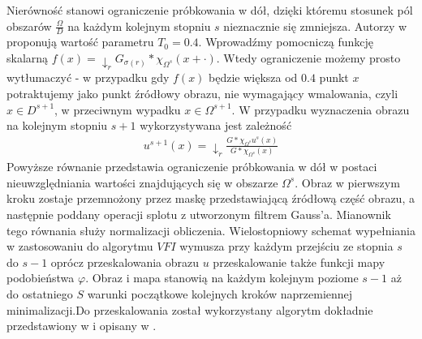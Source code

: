 \documentclass[12pt, twoside, openany]{report}
\theoremstyle{definition}
\begin{document}
Nierówność stanowi ograniczenie próbkowania w dół, dzięki któremu stosunek pól obszarów $\frac{\Omega}{D}$ na każdym kolejnym stopniu $s$ nieznacznie się zmniejsza. Autorzy w \cite{arias2011variational} proponują wartość parametru $T_0=0.4$. Wprowadźmy pomocniczą funkcję skalarną $f(x) = \downarrow_r G_{\sigma(r)}\ast\chi_{\Omega^s}(x + \cdot)$. Wtedy ograniczenie możemy prosto wytłumaczyć - w przypadku gdy $f(x)$ będzie większa od $0.4$ punkt $x$ potraktujemy jako punkt źródłowy obrazu, nie wymagający wmalowania, czyli $x \in D^{s+1}$, w przeciwnym wypadku $x \in \Omega^{s+1}.$ W przypadku wyznaczenia obrazu na kolejnym stopniu $s+1$ wykorzystywana jest zależność
\begin{align}
u^{s+1}(x)= \downarrow_r \frac{G \ast \chi_{\Omega^s} u^s(x)}{G \ast \chi_{\Omega^s}(x)}
\end{align}
Powyższe równanie przedstawia ograniczenie próbkowania w dół w postaci nieuwzględniania wartości znajdujących się w obszarze $\Omega^s$. Obraz w pierwszym kroku zostaje przemnożony przez maskę przedstawiającą źródłową część obrazu, a następnie poddany operacji splotu z utworzonym filtrem Gauss'a. Mianownik tego równania służy normalizacji obliczenia. Wielostopniowy schemat wypełniania w zastosowaniu do algorytmu $VFI$ wymusza przy każdym przejściu ze stopnia $s$ do $s-1$ oprócz przeskalowania obrazu $u$ przeskalowanie także funkcji mapy podobieństwa $\varphi$. Obraz i mapa stanowią na każdym kolejnym poziome $s-1$ aż do ostatniego $S$ warunki początkowe kolejnych kroków naprzemiennej minimalizacji.Do przeskalowania  został wykorzystany algorytm dokładnie przedstawiony w \cite{wexler2007space} i opisany w \cite{arias2011variational}.
\end{document}
